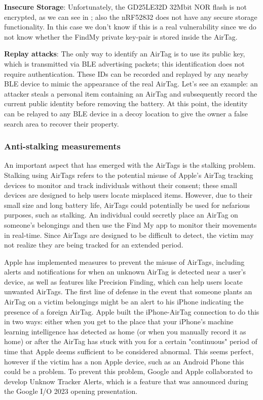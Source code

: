 \documentclass[english]{article}
\begin{document}
\textbf{Insecure Storage}: Unfortunately, the GD25LE32D 32Mbit NOR flash is not encrypted, as we can see in \cite{tweet}; also the nRF52832 does not have any secure storage functionality. In this case we don't know if this is a real vulnerability since we do not know whether the FindMy private key-pair is stored inside the AirTag.

\textbf{Replay attacks}: The only way to identify an AirTag is to use its public key, which is transmitted via BLE advertising packets; this identification does not require authentication. These IDs can be recorded and replayed by any nearby BLE device to mimic the appearance of the real AirTag. Let's see an example: an attacker steals a personal item containing an AirTag and subsequently record the current public identity before removing the battery. At this point, the identity can be relayed to any BLE device in a decoy location to give the owner a false search area to recover their property.
\subsubsection{Anti-stalking measurements}
An important aspect that has emerged with the AirTags is the stalking problem. Stalking using AirTags refers to the potential misuse of Apple's AirTag tracking devices to monitor and track individuals without their consent; these small devices are designed to help users locate misplaced items. However, due to their small size and long battery life, AirTags could potentially be used for nefarious purposes, such as stalking. An individual could secretly place an AirTag on someone's belongings and then use the Find My app to monitor their movements in real-time. Since AirTags are designed to be difficult to detect, the victim may not realize they are being tracked for an extended period.

Apple has implemented measures to prevent the misuse of AirTags, including alerts and notifications for when an unknown AirTag is detected near a user's device, as well as features like Precision Finding, which can help users locate unwanted AirTags. The first line of defense in the event that someone plants an AirTag on a victim belongings might be an alert to his iPhone indicating the presence of a foreign AirTag. Apple built the iPhone-AirTag connection to do this in two ways: either when you get to the place that your iPhone's machine learning intelligence has detected as home (or when you manually record it as home) or after the AirTag has stuck with you for a certain "continuous" period of time that Apple deems sufficient to be considered abnormal. This seems perfect, however if the victim has a non Apple device, such as an Android Phone this could be a problem. To prevent this problem, Google and Apple collaborated to develop Unknow Tracker Alerts, which is a feature that was announced during the Google I/O 2023 opening presentation.
\end{document}
